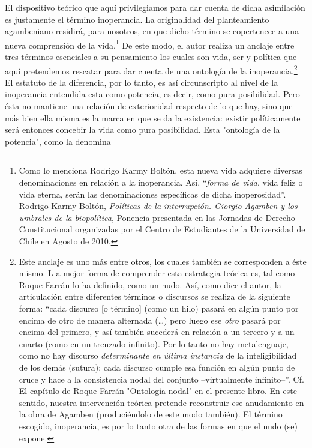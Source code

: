 El dispositivo teórico que aquí privilegiamos para dar cuenta de dicha
asimilación es justamente el término inoperancia. La originalidad del
planteamiento agambeniano residirá, para nosotros, en que dicho término
se copertenece a una nueva comprensión de la vida.\footnote{Como lo
  menciona Rodrigo Karmy Boltón, esta nueva vida adquiere diversas
  denominaciones en relación a la inoperancia. Así, \enquote{\emph{forma de vida},
  {vida feliz} o {vida eterna}, serán las denominaciones específicas
  de dicha inoperosidad}. Rodrigo Karmy Boltón, \emph{Políticas de la
  interrupción. Giorgio Agamben y los umbrales de la biopolítica},
  Ponencia presentada en las Jornadas de Derecho Constitucional
  organizadas por el Centro de Estudiantes de la Universidad de Chile en Agosto de 2010.}
  De este modo, el autor realiza un anclaje entre tres términos esenciales a su
pensamiento los cuales son vida, ser y política que aquí pretendemos
rescatar para dar cuenta de una ontología de la inoperancia.\footnote{Este
  anclaje es uno más entre otros, los cuales también se corresponden a
  éste mismo. L
  a mejor forma de comprender esta estrategia teórica es,
  tal como Roque Farrán lo ha definido, como un nudo. Así, como dice el
  autor, la articulación entre diferentes términos o discursos se
  realiza de la siguiente forma: \enquote{cada discurso {[}o término{]} (como un
  hilo) pasará en algún punto por encima de otro de manera alternada
  (\dots) pero luego ese \emph{otro} pasará por encima del primero,
  y así también sucederá en relación a un tercero y a un cuarto (como en
  un trenzado infinito). Por lo tanto no hay metalenguaje, como no hay
  discurso \emph{determinante en última instancia} de la inteligibilidad
  de los demás (sutura); cada discurso cumple esa función en algún punto
  de cruce y hace a la consistencia nodal del conjunto --virtualmente
  infinito--}. Cf. El capítulo de Roque Farrán "Ontología nodal" en el
  presente libro. En este sentido, nuestra intervención teórica pretende
  reconstruir ese anudamiento en la obra de Agamben (produciéndolo de
  este modo también). El término escogido, inoperancia, es por lo tanto
  otra de las formas en que el nudo (se) expone.} El estatuto de la
diferencia, por lo tanto, es así circunscripto al nivel de la
inoperancia entendida esta como potencia, es decir, como pura
posibilidad. Pero ésta no mantiene una relación de exterioridad respecto
de lo que hay, sino que más bien ella misma es la marca en que se da la
existencia: existir políticamente será entonces concebir la vida como
pura posibilidad. Esta "ontología de la potencia", como la denomina
